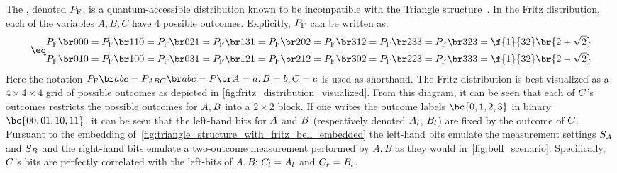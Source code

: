 \documentclass[aps, 10pt, english, twoside, pra, nofootinbib, tightenlines, longbibliography, superscriptaddress]{revtex4-1}
\begin{document}
    The , denoted $\prob[\fritz]$, is a quantum-accessible distribution known to be incompatible with the Triangle structure~\cite{Fritz_2012}. In the Fritz distribution, each of the variables $A,B,C$ have $4$ possible outcomes. Explicitly, $\prob[\fritz]$ can be written as:
    \begin{align*}
    \eq \label{eq:fritz_dist}
    \begin{split}
        \prob[\fritz][000] = \prob[\fritz][110] = \prob[\fritz][021] = \prob[\fritz][131] = \prob[\fritz][202] = \prob[\fritz][312] = \prob[\fritz][233] = \prob[\fritz][323] &= \f{1}{32}\br{2 + \sqrt{2}} \\
        \prob[\fritz][010] = \prob[\fritz][100] = \prob[\fritz][031] = \prob[\fritz][121] = \prob[\fritz][212] = \prob[\fritz][302] = \prob[\fritz][223] = \prob[\fritz][333] &= \f{1}{32}\br{2 - \sqrt{2}}
    \end{split}
    \end{align*}
    Here the notation $\prob[\fritz][abc] = \prob[\p{ABC}][abc] = \prob[][\p A=a,\p B=b,\p C=c]$ is used as shorthand. The Fritz distribution is best visualized as a $4 \times 4 \times 4$ grid of possible outcomes as depicted in \cref{fig:fritz_distribution_visualized}. From this diagram, it can be seen that each of $C$'s outcomes restricts the possible outcomes for $A,B$ into a $2 \times 2$ block. If one writes the outcome labels $\bc{0,1,2,3}$ in binary $\bc{00,01,10,11}$, it can be seen that the left-hand bits for $A$ and $B$ (respectively denoted $A_l$, $B_l$) are fixed by the outcome of $C$. Pursuant to the embedding of~\cref{fig:triangle_structure_with_fritz_bell_embedded} the left-hand bits emulate the measurement settings $S_{A}$ and $S_{B}$ and the right-hand bits emulate a two-outcome measurement performed by $A, B$ as they would in~\cref{fig:bell_scenario}. Specifically, $C$'s bits are perfectly correlated with the left-bits of $A,B$; $C_l = A_l$ and $C_r = B_l$.
\end{document}
